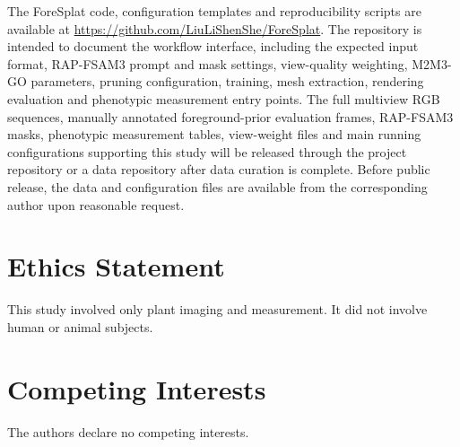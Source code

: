 \documentclass[a4paper]{cas-sc}
\begin{document}
The ForeSplat code, configuration templates and reproducibility scripts are available at \url{https://github.com/LiuLiShenShe/ForeSplat}. The repository is intended to document the workflow interface, including the expected input format, RAP-FSAM3 prompt and mask settings, view-quality weighting, M2M3-GO parameters, pruning configuration, training, mesh extraction, rendering evaluation and phenotypic measurement entry points. The full multiview RGB sequences, manually annotated foreground-prior evaluation frames, RAP-FSAM3 masks, phenotypic measurement tables, view-weight files and main running configurations supporting this study will be released through the project repository or a data repository after data curation is complete. Before public release, the data and configuration files are available from the corresponding author upon reasonable request.

\section*{Ethics Statement}

This study involved only plant imaging and measurement. It did not involve human or animal subjects.

\section*{Competing Interests}

The authors declare no competing interests.



\end{document}
